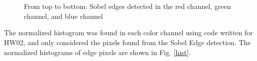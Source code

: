\documentclass{article}[12 pt]
\begin{document}
\begin{figure}[H]
\captionsetup[subfloat]{labelformat=empty}
\centering
{} \\
 \\
\caption{From top to bottom: Sobel edges detected in the red channel, green channel, and blue channel}
\label{edges}
\end{figure}

\noindent
The normalized histogram was found in each color channel using code written for HW02, and only considered the pixels found from the Sobel Edge detection.  The normalized histograms of edge pixels are shown in Fig. \ref{hist}.
\end{document}
